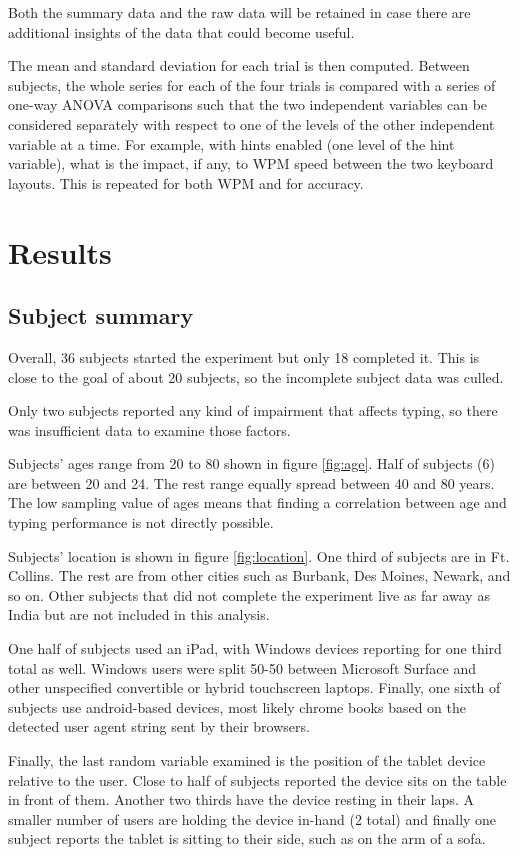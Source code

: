 \documentclass[english]{vgtc}
\begin{document}
Both the summary data and the raw data will be retained in case there are additional 
insights of the data that could become useful.

The mean and standard deviation for each trial is then computed.  
Between subjects, the whole series for each of the four trials is compared
with a series of one-way ANOVA comparisons such that the two independent
variables can be considered separately with respect to one of the levels
of the other independent variable at a time.  For example, with hints enabled
(one level of the hint variable), what is the impact, if any, to WPM speed
between the two keyboard layouts.  This is repeated for both WPM and for
accuracy.

\section{Results}
\subsection{Subject summary}
Overall, 36 subjects started the experiment but only 18 completed it.  This is close to the
goal of about 20 subjects, so the incomplete subject data was culled.

Only two subjects reported any kind of impairment that affects typing, so there
was insufficient data to examine those factors.

Subjects' ages range from 20 to 80 shown in figure \ref{fig:age}. Half of subjects (6) are between 20 and 24. The rest range equally spread between 40 and 80 years. 
The low sampling value of ages means that finding a correlation between age and typing performance is not
directly possible.

Subjects' location is shown in figure \ref{fig:location}. One third of subjects are in Ft. Collins. The rest are from other cities such as Burbank, Des Moines, Newark, and so on.  Other subjects that did not complete the experiment live as far away as India but are not included in this analysis.

One half of subjects used an iPad, with Windows devices reporting for one third total as well. Windows users were split 50-50 between Microsoft Surface and other unspecified convertible or hybrid touchscreen laptops.  Finally, one sixth of subjects use android-based devices, most likely chrome books based on the detected
user agent string sent by their browsers.

Finally, the last random variable examined is the position of the tablet device relative to the user. Close to half of subjects reported the device sits on the table in front of them.  Another two thirds have the device resting in their laps.  A smaller number of users are holding the device in-hand (2 total) and finally one subject reports the tablet is sitting to their side, such as on the arm of a sofa.
\end{document}
